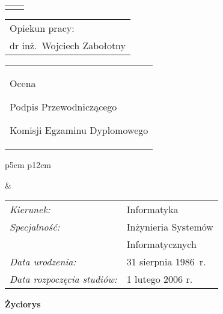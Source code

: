 \begin{titlepage}
{\begin{center}
	\vspace*{7\baselineskip}
	\hfill\mbox{}\par\vspace*{\baselineskip}\noindent
	\begin{tabular}[b]{@{}p{3cm}@{\ }l@{}}
	    {\large\hfill } & {\large }
	\end{tabular}
	\hfill
	\begin{tabular}[b]{@{}l@{}}
	Opiekun pracy: \\[\smallskipamount]
	{\large dr inż.\ Wojciech Zabołotny}
	\end{tabular}\par
	\vspace*{4\baselineskip}
    \begin{tabular}{p{\textwidth}}
    \begin{flushleft}
	\begin{minipage}{7cm}
	Ocena \dotfill
	\par\vspace{1.6\baselineskip}
	\dotfill
	\par\noindent
	\centerline{\footnotesize Podpis Przewodniczącego} \par
	\centerline{\footnotesize Komisji Egzaminu Dyplomowego}\par
	\end{minipage}
    \end{flushleft}
    \end{tabular}
    \end{center}}

    \newpage\thispagestyle{empty}
    \begin{tabular}{p{5cm} p{12cm}}
    \begin{minipage}{5cm}
    \center
    \end{minipage}
    &
    \begin{minipage}{12cm}
    \begin{flushleft}
    \par\noindent\vspace{1\baselineskip}
    \begin{tabular}[h]{l l}
    {\it Kierunek:}       & Informatyka \\[12pt]
    {\it Specjalność:}    & Inżynieria Systemów \\
                          & Informatycznych \\[12pt]
    {\it Data urodzenia:} & 31 sierpnia 1986~r. \\[12pt]
    {\it Data rozpoczęcia studiów:} & 1 lutego 2006 r. \\
    \end{tabular}
    \par\noindent\vspace{1\baselineskip}
    \end{flushleft}
    \end{minipage}
    \end{tabular}
    \vspace*{1\baselineskip}
    \begin{center}
	{\large\bfseries Życiorys}\par\bigskip
    \end{center}


\end{titlepage}
